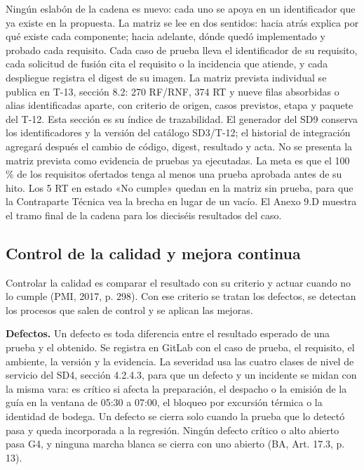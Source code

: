
Ningún eslabón de la cadena es nuevo: cada uno se apoya en un identificador que ya existe en la propuesta. La matriz se lee en dos sentidos: hacia atrás explica por qué existe cada componente; hacia adelante, dónde quedó implementado y probado cada requisito. Cada caso de prueba lleva el identificador de su requisito, cada solicitud de fusión cita el requisito o la incidencia que atiende, y cada despliegue registra el digest de su imagen. La matriz prevista individual se publica en T-13, sección 8.2: 270 RF/RNF, 374 RT y nueve filas absorbidas o alias identificadas aparte, con criterio de origen, casos previstos, etapa y paquete del T-12. Esta sección es su índice de trazabilidad. El generador del SD9 conserva los identificadores y la versión del catálogo SD3/T-12; el historial de integración agregará después el cambio de código, digest, resultado y acta. No se presenta la matriz prevista como evidencia de pruebas ya ejecutadas. La meta es que el 100 \% de los requisitos ofertados tenga al menos una prueba aprobada antes de su hito. Los 5 RT en estado «No cumple» quedan en la matriz sin prueba, para que la Contraparte Técnica vea la brecha en lugar de un vacío. El Anexo 9.D muestra el tramo final de la cadena para los dieciséis resultados del caso.

\subsection{Control de la calidad y mejora continua}

Controlar la calidad es comparar el resultado con su criterio y actuar cuando no lo cumple (PMI, 2017, p. 298). Con ese criterio se tratan los defectos, se detectan los procesos que salen de control y se aplican las mejoras.

\textbf{Defectos.} Un defecto es toda diferencia entre el resultado esperado de una prueba y el obtenido. Se registra en GitLab con el caso de prueba, el requisito, el ambiente, la versión y la evidencia. La severidad usa las cuatro clases de nivel de servicio del SD4, sección 4.2.4.3, para que un defecto y un incidente se midan con la misma vara: es crítico si afecta la preparación, el despacho o la emisión de la guía en la ventana de 05:30 a 07:00, el bloqueo por excursión térmica o la identidad de bodega. Un defecto se cierra solo cuando la prueba que lo detectó pasa y queda incorporada a la regresión. Ningún defecto crítico o alto abierto pasa G4, y ninguna marcha blanca se cierra con uno abierto (BA, Art. 17.3, p. 13).

